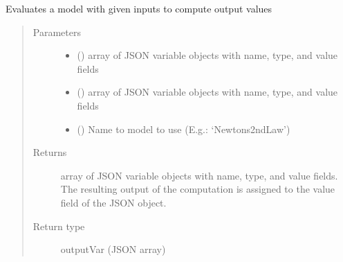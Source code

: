 \documentclass[letterpaper,10pt,english]{sphinxmanual}
\begin{document}
\begin{fulllineitems}
\begin{fulllineitems}
\end{fulllineitems}


\begin{fulllineitems}
\label{\detokenize{index:kChain.kChainModel.evaluate}}
Evaluates a model with given inputs to compute output values
\begin{quote}\begin{description}
\item[{Parameters}] \leavevmode\begin{itemize}
\item {} 
 () \textendash{} array of JSON variable objects with name, type, and value fields

\item {} 
 () \textendash{} array of JSON variable objects with name, type, and value fields

\item {} 
 () \textendash{} Name to model to use (E.g.: ‘Newtons2ndLaw’)

\end{itemize}

\item[{Returns}] \leavevmode
array of JSON variable objects with name, type, and value fields.
The resulting output of the computation is assigned to the value
field of the JSON object.

\item[{Return type}] \leavevmode
outputVar (JSON array)

\end{description}\end{quote}

\end{fulllineitems}



\end{fulllineitems}
\end{document}
